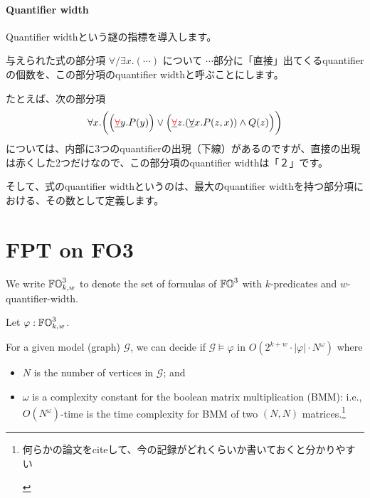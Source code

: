 \documentclass[a4paper,UKenglish,cleveref, autoref, thm-restate]{lipics-v2021}
\newcommand*{\Ja}[1]{%
  \begin{CJK}{UTF8}{ipxm}#1\end{CJK}%
}
\newenvironment{Jcomment}%
{\begin{screen}\begin{CJK}{UTF8}{ipxm}}%
{\end{CJK}\end{screen}}
\begin{document}
\paragraph*{Quantifier width}
\begin{Jcomment}
Quantifier widthという謎の指標を導入します。

与えられた式の部分項 $\forall/\exists x. ( \cdots )$ について $\cdots$部分に「直接」出てくるquantifierの個数を、この部分項のquantifier widthと呼ぶことにします。

たとえば、次の部分項
$$
\forall x.\biggl( \Bigl(\underline{{\color{red}\forall}} y. P(y)\Bigr) \lor \Bigl(\underline{{\color{red}\forall}} z. (\underline{\forall} x. P(z, x)) \land Q(z)\Bigr) \biggr)
$$
については、内部に3つのquantifierの出現（下線）があるのですが、直接の出現は赤くした2つだけなので、この部分項のquantifier widthは「２」です。

そして、式のquantifier widthというのは、最大のquantifier widthを持つ部分項における、その数として定義します。
\end{Jcomment}






\section{FPT on FO3}

We write $\mathbb{FO}^3_{k, w}$ to denote the set of formulas of $\mathbb{FO}^3$ with $k$-predicates and $w$-quantifier-width.

\begin{theorem}
\label{thm:FO3-FPT}
\mbox{}

Let $\varphi : \mathbb{FO}^3_{k, w}$.

For a given model (graph) $\mathcal{G}$,
we can decide if $\mathcal{G} \models \varphi$ in $O(2^{k + w} \cdot |\varphi| \cdot N^{\omega})$ where
\begin{itemize}
\item $N$ is the number of vertices in $\mathcal{G}$; and
\item $\omega$ is a complexity constant for the boolean matrix multiplication (BMM): i.e., $O(N^\omega)$-time is the time complexity for BMM of two $(N, N)$ matrices.\footnote{\Ja{何らかの論文をciteして、今の記録がどれくらいか書いておくと分かりやすい}}
\end{itemize}
\end{theorem}
\end{document}
